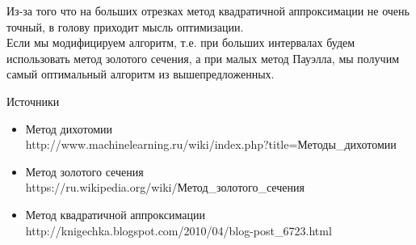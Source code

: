 \documentclass[10pt]{article}
\begin{document}
Из-за того что на больших отрезках метод квадратичной аппроксимации не очень точный, в голову приходит мысль оптимизации.\\
Если мы модифицируем алгоритм, т.е. при больших интервалах будем использовать метод золотого сечения, а при малых метод Пауэлла, мы получим самый оптимальный алгоритм из вышепредложенных.
\newpage
\begin{center}
\begin{large}
Источники
\end{large}
\end{center}
\begin{itemize}

\item Метод дихотомии\\
http://www.machinelearning.ru/wiki/index.php?title=Методы\_дихотомии
\item Метод золотого сечения\\
https://ru.wikipedia.org/wiki/Метод\_золотого\_сечения
\item Метод квадратичной аппроксимации\\
 http://knigechka.blogspot.com/2010/04/blog-post\_6723.html
\end{itemize}
\end{document}
